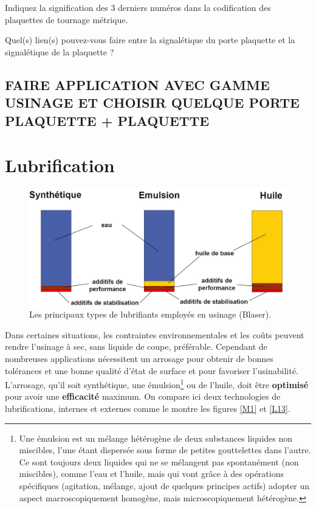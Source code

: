 \documentclass[12pt]{article}
\newcounter{exo}
\newenvironment{exo}{\stepcounter{exo}\vspace{0.5cm}{\bfseries Question \theexo\ :}}{\par\vspace{0.5cm}}
\begin{document}
\begin{exo} Indiquez la signification des 3 derniers numéros dans la codification des plaquettes de tournage métrique. \end{exo}


\begin{exo} Quel(s) lien(s) pouvez-vous faire entre la signalétique du porte plaquette et la signalétique de la plaquette ?\end{exo}


\subsection*{FAIRE APPLICATION AVEC GAMME USINAGE ET CHOISIR QUELQUE PORTE PLAQUETTE + PLAQUETTE}

\section{Lubrification}
\begin{figure}[h]
\centering
\includegraphics[width=0.7\linewidth]{Images/LU1.JPG}
\caption{Les principaux types de lubrifiants employés en usinage (Blaser).}
\label{bridppe}
\end{figure}

Dans certaines situations, les contraintes environnementales et les coûts peuvent rendre l'usinage à sec, sans liquide de coupe, préférable. Cependant de nombreuses applications nécessitent un arrosage pour obtenir de bonnes tolérances et une bonne qualité d'état de surface et pour favoriser l'usinabilité. L'arrosage, qu'il soit synthétique, une émulsion\footnote{Une émulsion est un mélange hétérogène de deux substances liquides non miscibles, l'une étant dispersée sous forme de petites gouttelettes dans l'autre. Ce sont toujours deux liquides qui ne se mélangent pas spontanément (non miscibles), comme l’eau et l’huile, mais qui vont grâce à des opérations spécifiques (agitation, mélange, ajout de quelques principes actifs) adopter un aspect macroscopiquement homogène, mais microscopiquement hétérogène.} ou de l'huile, doit être \textbf{optimisé} pour avoir une \textbf{efficacité} maximum. On compare ici deux technologies de lubrifications, internes et externes comme le montre les figures \ref{M1} et \ref{L13}.
\end{document}
